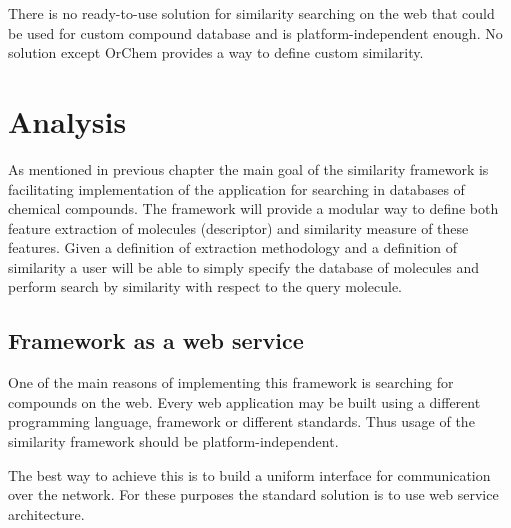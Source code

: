 \documentclass[thesis=M,english]{FITthesis}[2012/10/20]
\begin{document}
There is no ready-to-use solution for similarity searching on the web that could be used for custom compound database and is platform-independent enough. No solution except OrChem provides a way to define custom similarity. 


\chapter{Analysis}
\label{analRef}
As mentioned in previous chapter the main goal of the similarity framework is facilitating implementation of the application for searching in databases of chemical compounds. The framework will provide a modular way to define both feature extraction of molecules (descriptor) and similarity measure of these features. Given a definition of extraction methodology and a definition of similarity a user will be able to simply specify the database of molecules and perform search by similarity with respect to the query molecule. 

\section{Framework as a web service}
One of the main reasons of implementing this framework is searching for compounds on the web. Every web application may be built using a different programming language, framework or different standards. Thus usage of the similarity framework should be platform-independent.

The best way to achieve this is to build a uniform interface for communication over the network. For these purposes the standard solution is to use web service architecture.
\end{document}
